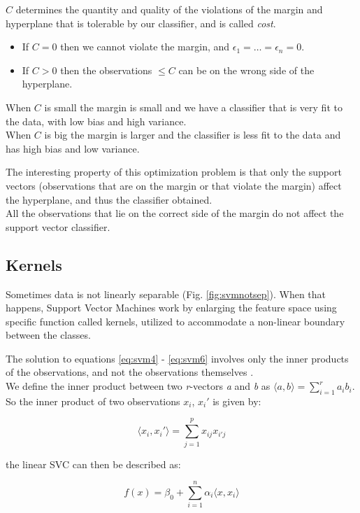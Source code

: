 $C$ determines the quantity and quality of the violations of the margin and hyperplane that is tolerable by our classifier, and is called \textit{cost}.
\begin{itemize}[noitemsep]
	\item If $C = 0$ then we cannot violate the margin, and $\epsilon_1 = \dots = \epsilon_n = 0$.
	\item If $C > 0$ then the observations $\le C$ can be on the wrong side of the hyperplane.
\end{itemize} 

When $C$ is small the margin is small and we have a classifier that is very fit to the data, with low bias and high variance. \\
When $C$ is big the margin is larger and the classifier is less fit to the data and has high bias and low variance.

The interesting property of this optimization problem is that only the support vectors (observations that are on the margin or that violate the margin) affect the hyperplane, and thus the classifier obtained. \\
All the observations that lie on the correct side of the margin do not affect the support vector classifier.

\subsection{Kernels} \label{kernel}
Sometimes data is not linearly separable (Fig. \ref{fig:svmnotsep}). When that happens, Support Vector Machines work by enlarging the feature space using specific function called kernels, utilized to accommodate a non-linear boundary between the classes.

The solution to equations \ref{eq:svm4} - \ref{eq:svm6} involves only the inner products of the observations, and not the observations themselves \cite{ISLR}.\\
We define the inner product between two \textit{r}-vectors \textit{a} and \textit{b} as $	\langle a,b \rangle = \sum_{i=1}^{r} a_{i}b_{i}$. So the inner product of two observations $x_i$, $x_i'$ is given by:

\begin{equation} \label{eq:svm9}
	\langle x_i, x_i' \rangle = \sum_{j=1}^{p} x_{ij}x_{i'j}
\end{equation}

the linear SVC can then be described as:

\begin{equation} \label{eq:svm10}
	f(x) = \beta_0 + \sum_{i=1}^{n} \alpha_i \langle x, x_i \rangle
\end{equation}

